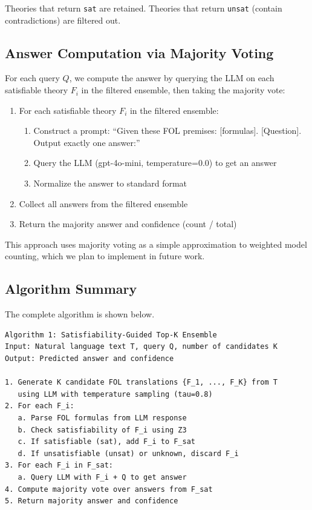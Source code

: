 \documentclass[11pt,letterpaper]{article}
\begin{document}
Theories that return \texttt{sat} are retained. Theories that return \texttt{unsat} (contain contradictions) are filtered out.

\subsection{Answer Computation via Majority Voting}

For each query $Q$, we compute the answer by querying the LLM on each satisfiable theory $F_i$ in the filtered ensemble, then taking the majority vote:

\begin{enumerate}
    \item For each satisfiable theory $F_i$ in the filtered ensemble:
    \begin{enumerate}
        \item Construct a prompt: ``Given these FOL premises: [formulas]. [Question]. Output exactly one answer:''
        \item Query the LLM (gpt-4o-mini, temperature=0.0) to get an answer
        \item Normalize the answer to standard format
    \end{enumerate}
    \item Collect all answers from the filtered ensemble
    \item Return the majority answer and confidence (count / total)
\end{enumerate}

This approach uses majority voting as a simple approximation to weighted model counting, which we plan to implement in future work.

\subsection{Algorithm Summary}

The complete algorithm is shown below.

\begin{verbatim}
Algorithm 1: Satisfiability-Guided Top-K Ensemble
Input: Natural language text T, query Q, number of candidates K
Output: Predicted answer and confidence

1. Generate K candidate FOL translations {F_1, ..., F_K} from T 
   using LLM with temperature sampling (tau=0.8)
2. For each F_i:
   a. Parse FOL formulas from LLM response
   b. Check satisfiability of F_i using Z3
   c. If satisfiable (sat), add F_i to F_sat
   d. If unsatisfiable (unsat) or unknown, discard F_i
3. For each F_i in F_sat:
   a. Query LLM with F_i + Q to get answer
4. Compute majority vote over answers from F_sat
5. Return majority answer and confidence
\end{verbatim}
\end{document}
